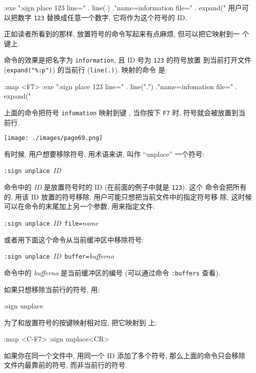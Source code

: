 \begin{vimcode}
:exe ":sign place 123 line=" . line(.) ."name=information file=" .
expand("%
用户可以把数字 \texttt{123} 替换成任意一个数字, 它将作为这个符号的 ID.

正如读者所看到的那样, 放置符号的命令写起来有点麻烦, 但可以把它映射到一
个键上.

命令的效果是把名字为 \texttt{information}, 且 ID 号为 \texttt{123} 的符号放置
到当前打开文件 (\verb'expand("%:p")') 的当前行 (\texttt{line(.)}). 映射的命令
是:
\begin{vimcode}
:map <F7> :exe ":sign place 123 line=" . line(".") ."name=infomation
file=" . expand("%
\end{vimcode}
上面的命令把符号 \texttt{infomation} 映射到键 , 当你按下 \texttt{F7}
时, 符号就会被放置到当前行.
\begin{center}
    \texttt{[image: ./images/page69.png]}
\end{center}
有时候, 用户想要移除符号, 用术语来讲, 叫作 ``unplace'' 一个符号:
\begin{vimcmdform}
\texttt{:sign unplace}\ \textit{ID}
\end{vimcmdform}

命令中的 \textit{ID} 是放置符号时的 ID (在前面的例子中就是 \texttt{123}). 这个
命令会把所有的, 用该 ID 放置的符号移除. 用户可能只想把当前文件中的指定符号移
除, 这时候可以在命令的末尾加上另一个参数, 用来指定文件:
\begin{vimcmdform}
\texttt{:sign unplace}\ \textit{ID}\ \texttt{file=}\textit{name}
\end{vimcmdform}
或者用下面这个命令从当前缓冲区中移除符号:
\begin{vimcmdform}
\texttt{:sign unplace}\ \textit{ID}\ \texttt{buffer=}\textit{bufferno}
\end{vimcmdform}
命令中的 \textit{bufferno} 是当前缓冲区的编号 (可以通过命令 \texttt{:buffers}
查看).

如果只想移除当前行的符号, 用:
\begin{vimcode}
:sign unplace
\end{vimcode}
为了和放置符号的按键映射相对应, 把它映射到  上:
\begin{vimcode}
:map <C-F7> :sign unplace<CR>
\end{vimcode}

\begin{warning}
    如果你在同一个文件中, 用同一个 ID 添加了多个符号, 那么上面的命令只会移除
    文件内最靠前的符号, 而非当前行的符号.
\end{warning}


\end{vimcode}

